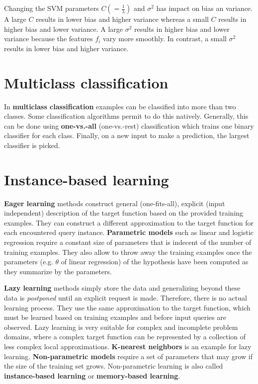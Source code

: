 \documentclass{report}
\begin{document}
Changing the SVM parameters $C(=\frac{1}{\lambda})$ and $\sigma^2$ has impact on bias an variance.  A large $C$ results in lower bias and higher variance whereas a small $C$ results in higher bias and lower variance. A large $\sigma^2$ results in higher bias and lower variance because the features $f_i$ vary more smoothly. In contrast, a small $\sigma^2$ results in lower bias and higher variance.

\section{Multiclass classification}
In {\bf multiclass classification} examples can be classified into more than two classes. Some classification algorithms permit to do this natively. Generally, this can be done using {\bf one-vs.-all} (one-vs.-rest) classification which trains one binary classifier for each class. Finally, on a new input to make a prediction, the largest classifier is picked.

\section{Instance-based learning}
{\bf Eager learning} methods construct general (one-fits-all), explicit (input independent) description of the target function based on the provided training examples. They can construct a different approximation to the target function for each encountered query instance.
{\bf Parametric models} such as linear and logistic regression require a constant size of parameters that is indecent of the number of training examples. They also allow to throw away the training examples once the parameters (e.g. $\theta$ of linear regression) of the hypothesis have been computed as they summarize by the parameters.

{\bf Lazy learning} methods simply store the data and generalizing beyond these data is {\em postponed} until an explicit request is made. Therefore, there is no actual learning process.
They use the same approximation to the target function, which must be learned based on training examples and before input queries are observed.
Lazy learning is very suitable for complex and incomplete problem domains, where a complex target function can be represented by a collection of less complex local approximations.
{\bf K-nearest neighbors} is an example for lazy learning.
{\bf Non-parametric models} require a set of parameters that may grow if the size of the training set grows. Non-parametric learning is also called {\bf instance-based learning} or {\bf memory-based learning}.
\end{document}
